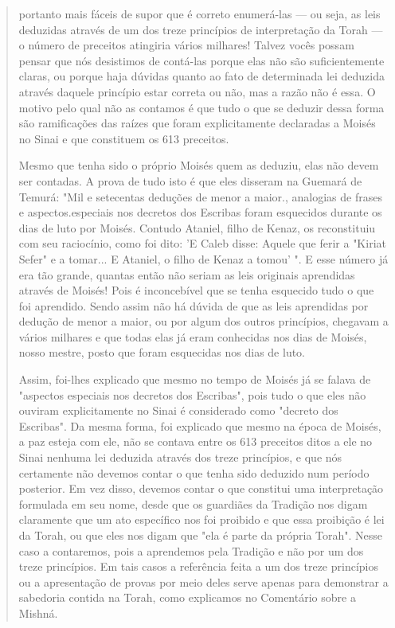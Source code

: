 \begin{quote}
portanto mais fáceis de supor que é correto enumerá-las --- ou seja, as
leis de­duzidas através de um dos treze princípios de interpretação da
Torah --- o nú­mero de preceitos atingiria vários milhares! Talvez vocês
possam pensar que nós desistimos de contá-las porque elas não são
suficientemente claras, ou por­que haja dúvidas quanto ao fato de
determinada lei deduzida através daquele princípio estar correta ou não,
mas a razão não é essa. O motivo pelo qual não as contamos é que tudo o
que se deduzir dessa forma são ramificações das raí­zes que foram
explicitamente declaradas a Moisés no Sinai e que constituem os 613
preceitos.

Mesmo que tenha sido o próprio Moisés quem as deduziu, elas não devem
ser contadas. A prova de tudo isto é que eles disseram na Guemará de
Temurá: "Mil e setecentas deduções de menor a maior., analogias de
frases e aspectos.especiais nos decretos dos Escribas foram esquecidos
durante os dias de luto por Moisés. Contudo Ataniel, filho de Kenaz, os
reconstituiu com seu raciocínio, como foi dito: 'E Caleb disse: Aquele
que ferir a "Kiriat Sefer" e a tomar... E Ataniel, o filho de Kenaz a
tomou' ". E esse número já era tão gran­de, quantas então não seriam as
leis originais aprendidas através de Moisés! Pois é inconcebível que se
tenha esquecido tudo o que foi aprendido. Sendo assim não há dúvida de
que as leis aprendidas por dedução de menor a maior, ou por algum dos
outros princípios, chegavam a vários milhares e que todas elas já eram
conhecidas nos dias de Moisés, nosso mestre, posto que foram esqueci­das
nos dias de luto.

Assim, foi-lhes explicado que mesmo no tempo de Moisés já se fala­va de
"aspectos especiais nos decretos dos Escribas", pois tudo o que eles não
ouviram explicitamente no Sinai é considerado como "decreto dos
Escribas". Da mesma forma, foi explicado que mesmo na época de Moisés, a
paz esteja com ele, não se contava entre os 613 preceitos ditos a ele no
Sinai nenhuma lei deduzida através dos treze princípios, e que nós
certamente não devemos contar o que tenha sido deduzido num período
posterior. Em vez disso, deve­mos contar o que constitui uma
interpretação formulada em seu nome, desde que os guardiães da Tradição
nos digam claramente que um ato específico nos foi proibido e que essa
proibição é lei da Torah, ou que eles nos digam que "ela é parte da
própria Torah". Nesse caso a contaremos, pois a aprendemos pela Tradição
e não por um dos treze princípios. Em tais casos a referência feita a um
dos treze princípios ou a apresentação de provas por meio deles serve
apenas para demonstrar a sabedoria contida na Torah, como explicamos no
Co­mentário sobre a Mishná.


\end{quote}
